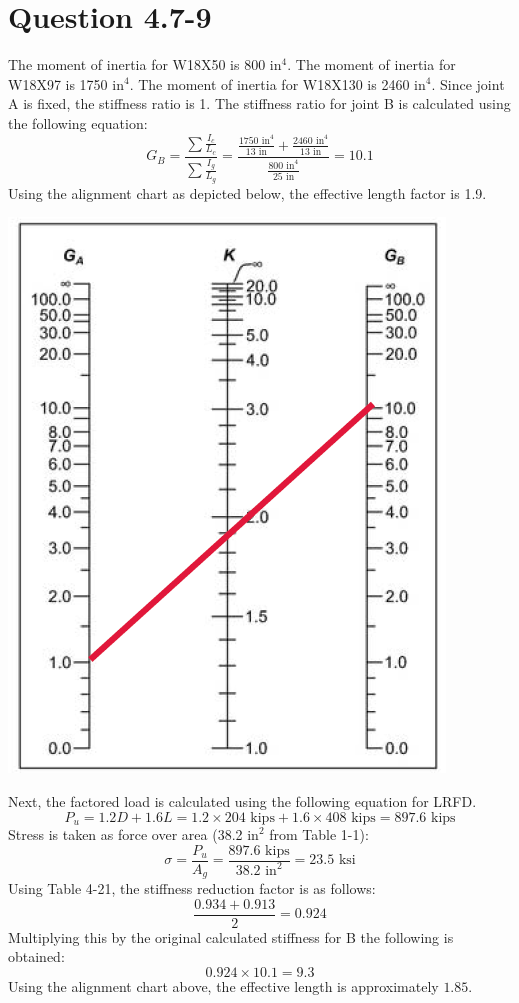 \documentclass{article}
\begin{document}
\section*{Question 4.7-9}
The moment of inertia for W18X50 is 800 $\text{in}^4$. The moment of inertia for W18X97 is 1750 $\text{in}^4$. The moment of inertia for W18X130 is 2460 $\text{in}^4$. Since joint A is fixed, the stiffness ratio is 1. The stiffness ratio for joint B is calculated using the following equation: 
\[G_B=\frac{\sum\frac{I_c}{L_c}}{\sum\frac{I_g}{L_g}}=\frac{\frac{1750\text{ in}^4}{13\text{ in}}+\frac{2460\text{ in}^4}{13\text{ in}}}{\frac{800\text{ in}^4}{25\text{ in}}}=10.1\]
Using the alignment chart as depicted below, the effective length factor is 1.9.
\begin{center}
    \includegraphics*[scale=0.5]{fig1.png}
\end{center}
Next, the factored load is calculated using the following equation for LRFD. 
\[P_u=1.2D+1.6L=1.2\times204\text{ kips}+1.6\times408\text{ kips}=897.6\text{ kips}\] 
Stress is taken as force over area (38.2 $\text{in}^2$ from Table 1-1): 
\[\sigma=\frac{P_u}{A_g}=\frac{897.6\text{ kips}}{38.2\text{ in}^2}=23.5\text{ ksi}\]
Using Table 4-21, the stiffness reduction factor is as follows: 
\[\frac{0.934+0.913}{2}=0.924\] 
Multiplying this by the original calculated stiffness for B the following is obtained: 
\[0.924\times 10.1=9.3\]
Using the alignment chart above, the effective length is approximately $\boxed{1.85}$.
\newpage
\end{document}
